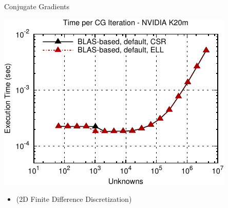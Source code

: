 \begin{frame}[fragile]{Conjugate Gradients}

 \begin{block}{}
 
 \begin{center}
  \vspace*{-0.5cm}
  \includegraphics[width=0.85\textwidth]{figures/cg-k20m-1}
 \end{center}

 \begin{itemize}
  \item   \vspace*{-0.3cm} {\small (2D Finite Difference Discretization)}
 \end{itemize}

 \end{block}
   
\end{frame}


